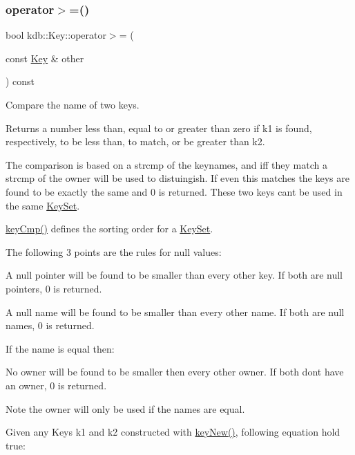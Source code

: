 \subsubsection{\texorpdfstring{operator$>$=()}{operator>=()}}
{\footnotesize\ttfamily bool kdb\+::\+Key\+::operator$>$= (\begin{DoxyParamCaption}\item[{const \mbox{\hyperlink{classkdb_1_1Key}{Key}} \&}]{other }\end{DoxyParamCaption}) const\hspace{0.3cm}{\ttfamily [inline]}}



Compare the name of two keys. 

\begin{DoxyReturn}{Returns}
a number less than, equal to or greater than zero if k1 is found, respectively, to be less than, to match, or be greater than k2.
\end{DoxyReturn}
The comparison is based on a strcmp of the keynames, and iff they match a strcmp of the owner will be used to distuingish. If even this matches the keys are found to be exactly the same and 0 is returned. These two keys can\textquotesingle{}t be used in the same \mbox{\hyperlink{classkdb_1_1KeySet}{Key\+Set}}.

\mbox{\hyperlink{group__keytest_gaf6e66e12fe04d535a5d1c8218ced803e}{key\+Cmp()}} defines the sorting order for a \mbox{\hyperlink{classkdb_1_1KeySet}{Key\+Set}}.

The following 3 points are the rules for null values\+:


\begin{DoxyItemize}
\item A null pointer will be found to be smaller than every other key. If both are null pointers, 0 is returned.
\item A null name will be found to be smaller than every other name. If both are null names, 0 is returned.
\end{DoxyItemize}

If the name is equal then\+:


\begin{DoxyItemize}
\item No owner will be found to be smaller then every other owner. If both don\textquotesingle{}t have an owner, 0 is returned.
\end{DoxyItemize}

\begin{DoxyNote}{Note}
the owner will only be used if the names are equal.
\end{DoxyNote}
Given any Keys k1 and k2 constructed with \mbox{\hyperlink{group__key_gad23c65b44bf48d773759e1f9a4d43b89}{key\+New()}}, following equation hold true\+:


